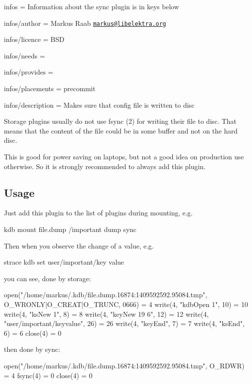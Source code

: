 
\begin{DoxyItemize}
\item infos = Information about the sync plugin is in keys below
\item infos/author = Markus Raab \href{mailto:markus@libelektra.org}{\tt markus@libelektra.\+org}
\item infos/licence = B\+S\+D
\item infos/needs =
\item infos/provides =
\item infos/placements = precommit
\item infos/description = Makes sure that config file is written to disc
\end{DoxyItemize}

Storage plugins usually do not use fsync (2) for writing their file to disc. That means that the content of the file could be in some buffer and not on the hard disc.

This is good for power saving on laptops, but not a good idea on production use otherwise. So it is strongly recommended to always add this plugin.

\subsection*{Usage}

Just add this plugin to the list of plugins during mounting, e.\+g. \begin{DoxyVerb}    kdb mount file.dump /important dump sync
\end{DoxyVerb}


Then when you observe the change of a value, e.\+g. \begin{DoxyVerb}    strace kdb set user/important/key value
\end{DoxyVerb}


you can see, done by storage\+: \begin{DoxyVerb}    open("/home/markus/.kdb/file.dump.16874:1409592592.95084.tmp", O_WRONLY|O_CREAT|O_TRUNC, 0666) = 4
    write(4, "kdbOpen 1\n", 10)             = 10
    write(4, "ksNew 1\n", 8)                = 8
    write(4, "keyNew 19 6\n", 12)           = 12
    write(4, "user/important/key\0value\0\n", 26) = 26
    write(4, "keyEnd\n", 7)                 = 7
    write(4, "ksEnd\n", 6)                  = 6
    close(4)                                = 0
\end{DoxyVerb}


then done by sync\+: \begin{DoxyVerb}    open("/home/markus/.kdb/file.dump.16874:1409592592.95084.tmp",
                    O_RDWR) = 4
    fsync(4)                                = 0
    close(4)                                = 0
\end{DoxyVerb}


